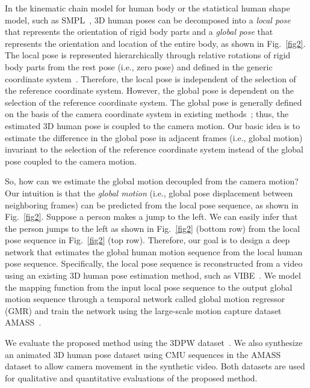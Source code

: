 \documentclass[10pt,twocolumn,letterpaper]{article}
\begin{document}
In the kinematic chain model for human body or the statistical human shape model, such as SMPL~\cite{loper2015smpl}, 3D human poses can be decomposed into a \emph{local pose} that represents the orientation of rigid body parts and a \emph{global pose} that represents the orientation and location of the entire body, as shown in Fig.~\ref{fig2}. The local pose is represented hierarchically through relative rotations of rigid body parts from the rest pose (i.e., zero pose) and defined in the generic coordinate system~\cite{loper2015smpl}. Therefore, the local pose is independent of the selection of the reference coordinate system. However, the global pose is dependent on the selection of the reference coordinate system. The global pose is generally defined on the basis of the camera coordinate system in existing methods~\cite{pavlakos2018learning,kanazawa2018end,kolotouros2019learning,kocabas2020vibe,Luo_2020_ACCV}; thus, the estimated 3D human pose is coupled to the camera motion. Our basic idea is to estimate the difference in the global pose in adjacent frames (i.e., global motion) invariant to the selection of the reference coordinate system instead of the global pose coupled to the camera motion.



So, how can we estimate the global motion decoupled from the camera motion? Our intuition is that the \emph{global motion} (i.e., global pose displacement between neighboring frames) can be predicted from the local pose sequence, as shown in Fig.~\ref{fig2}. Suppose a person makes a jump to the left. We can easily infer that the person jumps to the left as shown in Fig.~\ref{fig2} (bottom row) from the local pose sequence in Fig.~\ref{fig2} (top row). Therefore, our goal is to design a deep network that estimates the global human motion sequence from the local human pose sequence. Specifically, the local pose sequence is reconstructed from a video using an existing 3D human pose estimation method, such as VIBE~\cite{kocabas2020vibe}. We model the mapping function from the input local pose sequence to the output global motion sequence through a temporal network called global motion regressor (GMR) and train the network using the large-scale motion capture dataset AMASS~\cite{mahmood2019amass}. 


We evaluate the proposed method using the 3DPW dataset~\cite{von2018recovering}. We also synthesize an animated 3D human pose dataset using CMU sequences in the AMASS dataset to allow camera movement in the synthetic video. Both datasets are used for qualitative and quantitative evaluations of the proposed method.
\end{document}
